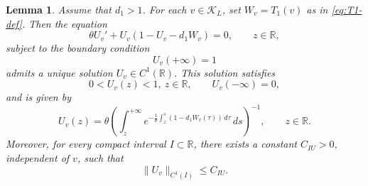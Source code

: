 \documentclass[10pt,a4paper]{amsart}
\newtheorem{lemma}{Lemma}
\begin{document}
\begin{lemma}\label{lem:U-basic}
Assume that $d_1>1$. For each $v\in\mathcal K_L$, set
$W_v=T_1(v)$ as in \eqref{eq:T1-def}. Then the equation
\begin{equation}\label{eq:Uv-problem}
\theta U_v'+U_v(1-U_v-d_1W_v)=0,\qquad z\in\mathbb R,
\end{equation}
subject to the boundary condition
\begin{equation}\label{eq:Uv-plus-bc}
U_v(+\infty)=1
\end{equation}
admits a unique solution $U_v\in C^1(\mathbb R)$. This solution satisfies
\begin{equation*}
0<U_v(z)<1,\ z\in\mathbb R,\qquad U_v(-\infty)=0,
\end{equation*}
and is given by
\begin{equation}\label{eq:Uv-formula}
U_v(z)=\theta\left(\int_z^{+\infty}e^{-\frac{1}{\theta}\int_z^s(1-d_1W_v(\tau))\,d\tau}\,ds\right)^{-1},\qquad z\in\mathbb R.
\end{equation}
Moreover, for every compact interval $I\subset\mathbb R$, there exists a constant $C_{IU}>0$, independent of $v$, such that
\begin{equation}\label{eq:U-C1}
\|U_v\|_{C^1(I)}\le C_{IU}.
\end{equation}
\end{lemma}
\end{document}
